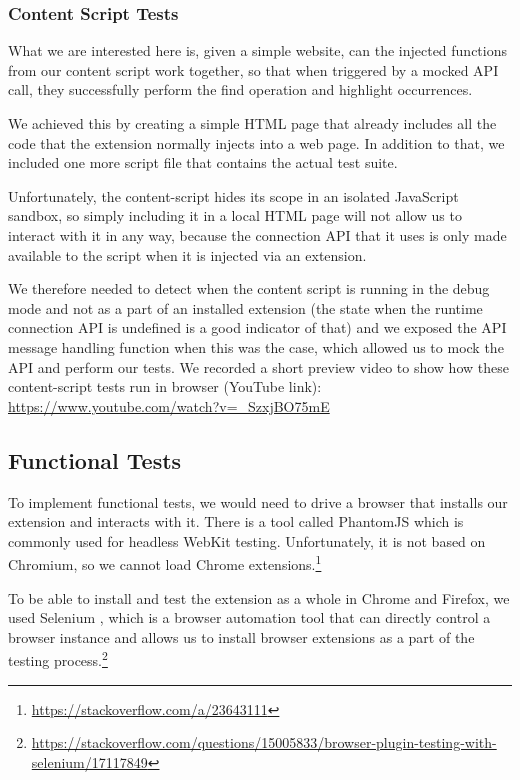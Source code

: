 \documentclass[bsc,frontabs,twoside,singlespacing,parskip,deptreport]{infthesis}
\begin{document}
\subsubsection{Content Script Tests}
What we are interested here is, given a simple website, can the injected functions from our content script work together, so that when triggered by a mocked API call, they successfully perform the find operation and highlight occurrences.

We achieved this by creating a simple HTML page that already includes all the code that the extension normally injects into a web page. In addition to that, we included one more script file that contains the actual test suite.

Unfortunately, the content-script hides its scope in an isolated JavaScript sandbox, so simply including it in a local HTML page will not allow us to interact with it in any way, because the connection API that it uses is only made available to the script when it is injected via an extension.

We therefore needed to detect when the content script is running in the debug mode and not as a part of an installed extension (the state when the runtime connection API is undefined is a good indicator of that) and we exposed the API message handling function when this was the case, which allowed us to mock the API and perform our tests. We recorded a short preview video to show how these content-script tests run in browser (YouTube link): \url{https://www.youtube.com/watch?v=_SzxjBO75mE}

\subsection{Functional Tests}
To implement functional tests, we would need to drive a browser that installs our extension and interacts with it. There is a tool called PhantomJS \cite{A14} which is commonly used for headless WebKit testing. Unfortunately, it is not based on Chromium, so we cannot load Chrome extensions.\footnote{\url{https://stackoverflow.com/a/23643111}}

To be able to install and test the extension as a whole in Chrome and Firefox, we used Selenium \cite{A15}, which is a browser automation tool that can directly control a browser instance and allows us to install browser extensions as a part of the testing process.\footnote{\url{https://stackoverflow.com/questions/15005833/browser-plugin-testing-with-selenium/17117849}}
\end{document}
